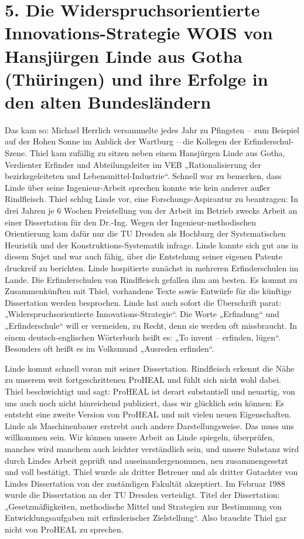 \documentclass[11pt,a4paper]{article}
\begin{document}
\section*{5. Die Widerspruchsorientierte Innovations-Strategie WOIS von
  Hansjürgen Linde aus Gotha (Thüringen) und ihre Erfolge in den alten
  Bundesländern}

Das kam so: Michael Herrlich versammelte jedes Jahr zu Pfingsten – zum Beispiel
auf der Hohen Sonne im Anblick der Wartburg – die Kollegen der
Erfinderschul-Szene.  Thiel kam zufällig zu sitzen neben einem Hansjürgen Linde
aus Gotha, Verdienter Erfinder und Abteilungsleiter im VEB „Rationalisierung
der bezirksgeleiteten und Lebensmittel-Industrie“.  Schnell war zu bemerken,
dass Linde über seine Ingenieur-Arbeit sprechen konnte wie kein anderer außer
Rindfleisch. Thiel schlug Linde vor, eine Forschungs-Aspirantur zu beantragen:
In drei Jahren je 6 Wochen Freistellung von der Arbeit im Betrieb zwecks Arbeit
an einer Dissertation für den Dr.-Ing. Wegen der Ingenieur-methodischen
Orientierung kam dafür nur die TU Dresden als Hochburg der Systematischen
Heuristik und der Konstruktions-Systematik infrage. Linde kannte sich gut aus
in diesem Sujet und war auch fähig, über die Entstehung seiner eigenen Patente
druckreif zu berichten. Linde hospitierte zunächst in mehreren Erfinderschulen
im Lande.  Die Erfinderschulen von Rindfleisch gefallen ihm am besten. Es kommt
zu Zusammenkünften mit Thiel, vorhandene Texte sowie Entwürfe für die künftige
Dissertation werden besprochen. Linde hat auch sofort die Überschrift parat:
„Widerspruchsorientierte Innovations-Strategie“. Die Worte „Erfindung“ und
„Erfinderschule“ will er vermeiden, zu Recht, denn sie werden oft missbraucht.
In einem deutsch-englischen Wörterbuch heißt es: „To invent – erfinden, lügen“.
Besonders oft heißt es im Volksmund „Ausreden erfinden“.

\enlargethispage{-2em}
Linde kommt schnell voran mit seiner Dissertation. Rindfleisch erkennt die Nähe
zu unserem weit fortgeschrittenen ProHEAL und fühlt sich nicht wohl dabei.
Thiel beschwichtigt und sagt: ProHEAL ist derart substantiell und neuartig, von
uns auch noch nicht hinreichend publiziert, dass wir glücklich sein können: Es
entsteht eine zweite Version von ProHEAL und mit vielen neuen Eigenschaften.
Linde als Maschinenbauer erstrebt auch andere Darstellungsweise. Das muss uns
willkommen sein. Wir können unsere Arbeit an Linde spiegeln, überprüfen,
manches wird manchem auch leichter verständlich sein, und unsere Substanz wird
durch Lindes Arbeit geprüft und auseinandergenommen, neu zusammengesetzt und
voll bestätigt. Thiel wurde als dritter Betreuer und als dritter Gutachter von
Lindes Dissertation von der zuständigen Fakultät akzeptiert. Im Februar 1988
wurde die Dissertation an der TU Dresden verteidigt. Titel der Dissertation:
„Gesetzmäßigkeiten, methodische Mittel und Strategien zur Bestimmung von
Entwicklungsaufgaben mit erfinderischer Zielstellung“. Also brauchte Thiel gar
nicht von ProHEAL zu sprechen.
\end{document}
